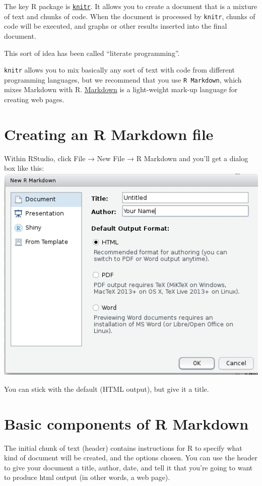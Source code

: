 \documentclass[]{book}
\begin{document}
The key R package is \href{http://yihui.name/knitr/}{\texttt{knitr}}. It
allows you to create a document that is a mixture of text and chunks of
code. When the document is processed by \texttt{knitr}, chunks of code
will be executed, and graphs or other results inserted into the final
document.

This sort of idea has been called ``literate programming''.

\texttt{knitr} allows you to mix basically any sort of text with code
from different programming languages, but we recommend that you use
\texttt{R\ Markdown}, which mixes Markdown with R.
\href{https://www.markdownguide.org/}{Markdown} is a light-weight
mark-up language for creating web pages.

\section{Creating an R Markdown file}\label{creating-an-r-markdown-file}

Within RStudio, click File → New File → R Markdown and you'll get a
dialog box like this: \includegraphics{../fig/New_R_Markdown.png}

You can stick with the default (HTML output), but give it a title.

\section{Basic components of R
Markdown}\label{basic-components-of-r-markdown}

The initial chunk of text (header) contains instructions for R to
specify what kind of document will be created, and the options chosen.
You can use the header to give your document a title, author, date, and
tell it that you're going to want to produce html output (in other
words, a web page).
\end{document}
